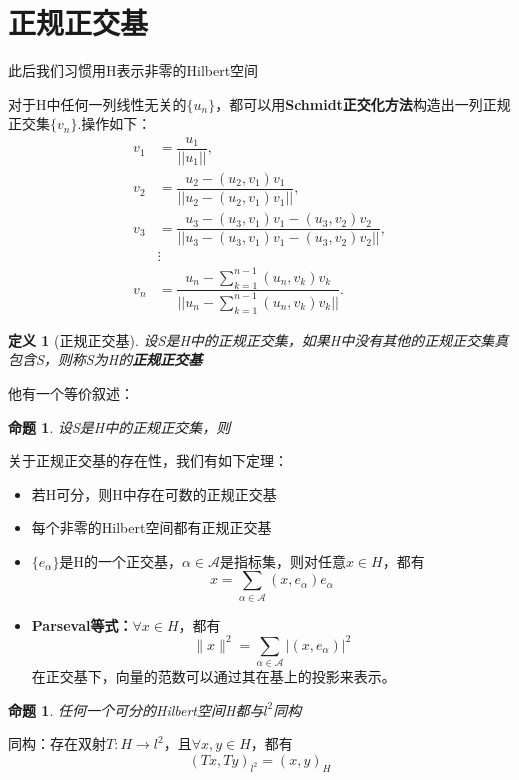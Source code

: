 \documentclass[12pt, a4paper, oneside, fontset=windows]{ctexbook}
\newtheorem{definition}{定义}[section]
\newtheorem{proposition}[theorem]{命题}
\begin{document}
    \section{正规正交基}
    此后我们习惯用H表示非零的Hilbert空间\\
    \begin{tcolorbox}
        对于H中任何一列线性无关的$\{u_n\}$，都可以用{\bf Schmidt正交化方法}构造出一列正规正交集$\{v_n\}$.操作如下：
        \begin{align*}
            v_1 &= \dfrac{u_1}{||u_1||}, \\
            v_2 &= \dfrac{u_2 - (u_2, v_1)v_1}{||u_2 - (u_2, v_1)v_1||}, \\
            v_3 &= \dfrac{u_3 - (u_3, v_1)v_1 - (u_3, v_2)v_2}{||u_3 - (u_3, v_1)v_1 - (u_3, v_2)v_2||}, \\
            &\vdots \\
            v_n &= \dfrac{u_n - \sum_{k=1}^{n-1} (u_n, v_k)v_k}{||u_n - \sum_{k=1}^{n-1} (u_n, v_k)v_k||}.
        \end{align*}
    \end{tcolorbox}
    \begin{definition}[正规正交基]
        设S是H中的正规正交集，如果H中没有其他的正规正交集真包含S，则称S为H的\textbf{正规正交基}
    \end{definition}
    他有一个等价叙述：\\
    \begin{proposition}
        设S是H中的正规正交集，则
    \end{proposition}
    关于正规正交基的存在性，我们有如下定理：
    \begin{itemize}
        \item 若H可分，则H中存在可数的正规正交基
        \item 每个非零的Hilbert空间都有正规正交基
        \item $\{e_\alpha \}$是H的一个正交基，$\alpha \in \mathcal{A}$是指标集，则对任意$x\in H$，都有
        \[x=\sum_{\alpha \in \mathcal{A}}(x,e_\alpha)e_\alpha\]
        \item {\bf Parseval等式：}$\forall x\in H$，都有
        \[\|x\|^2=\sum_{\alpha \in \mathcal{A}}|(x,e_\alpha)|^2\]
        在正交基下，向量的范数可以通过其在基上的投影来表示。
    \end{itemize}
    \begin{proposition}
        任何一个可分的Hilbert空间H都与$l^2$同构
    \end{proposition}
    \begin{tcolorbox}
        同构：存在双射$T:H\to l^2$，且$\forall x,y\in H$，都有
        \[(Tx,Ty)_{l^2}={(x,y)}_H\]
    \end{tcolorbox}
\end{document}
